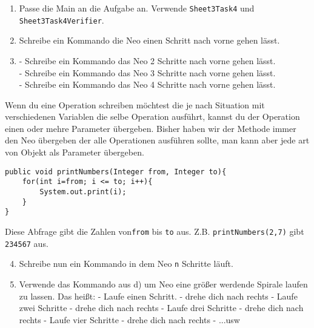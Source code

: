 
\begin{enumerate}
	\item 
		Passe die Main an die Aufgabe an. Verwende \lstinline{Sheet3Task4} und \lstinline{Sheet3Task4Verifier}.
	\item 
		Schreibe ein Kommando die Neo einen Schritt nach vorne gehen lässt.
	\item 
		- Schreibe ein Kommando das Neo 2 Schritte nach vorne gehen lässt.\\
		- Schreibe ein Kommando das Neo 3 Schritte nach vorne gehen lässt.\\
		- Schreibe ein Kommando das Neo 4 Schritte nach vorne gehen lässt.
\end{enumerate}

\begin{Infobox}
	Wenn du eine Operation schreiben möchtest die je nach Situation mit verschiedenen Variablen die selbe Operation ausführt, kannst du der Operation einen oder mehre Parameter übergeben. 
	Bisher haben wir der Methode immer den Neo übergeben der alle Operationen ausführen sollte, man kann aber jede art von Objekt als Parameter übergeben.
	
	\begin{lstlisting}[xleftmargin=0.5cm]
public void printNumbers(Integer from, Integer to){
    for(int i=from; i <= to; i++){
        System.out.print(i);
    }
}
	\end{lstlisting}

	Diese Abfrage gibt die Zahlen von\lstinline{from} bis \lstinline{to} aus. 
	Z.B. \lstinline{printNumbers(2,7)} gibt \lstinline{234567} aus.
\end {Infobox}


\begin{enumerate}\setcounter{enumi}{3}
	\item
		Schreibe nun ein Kommando in dem Neo \lstinline{n} Schritte läuft.

	\item
		Verwende das Kommando aus d) um Neo eine größer werdende Spirale laufen zu lassen. Das heißt:
		- Laufe einen Schritt.
		- drehe dich nach rechts
		- Laufe zwei Schritte
		- drehe dich nach rechts
		- Laufe drei Schritte
		- drehe dich nach rechts
		- Laufe vier Schritte
		- drehe dich nach rechts
		- ...usw
\end{enumerate}

\newpage

